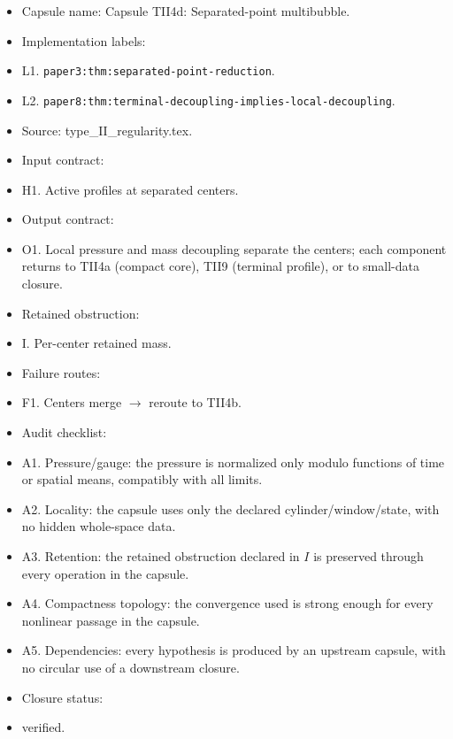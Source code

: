 \documentclass[11pt]{amsart}
\begin{document}
\begin{itemize}
  \item Capsule name: Capsule TII4d: Separated-point multibubble.
  \item Implementation labels:
  \item L1. \texttt{paper3:thm:separated-point-reduction}.
  \item L2. \texttt{paper8:thm:terminal-decoupling-implies-local-decoupling}.
  \item Source: type\_II\_regularity.tex.
  \item Input contract:
  \item H1. Active profiles at separated centers.
  \item Output contract:
  \item O1. Local pressure and mass decoupling separate the centers; each component returns to TII4a (compact core), TII9 (terminal profile), or to small-data closure.
  \item Retained obstruction:
  \item I. Per-center retained mass.
  \item Failure routes:
  \item F1. Centers merge $\to$ reroute to TII4b.
  \item Audit checklist:
  \item A1. Pressure/gauge: the pressure is normalized only modulo functions of time or spatial means, compatibly with all limits.
  \item A2. Locality: the capsule uses only the declared cylinder/window/state, with no hidden whole-space data.
  \item A3. Retention: the retained obstruction declared in $I$ is preserved through every operation in the capsule.
  \item A4. Compactness topology: the convergence used is strong enough for every nonlinear passage in the capsule.
  \item A5. Dependencies: every hypothesis is produced by an upstream capsule, with no circular use of a downstream closure.
  \item Closure status:
  \item verified.
\end{itemize}
\end{document}
